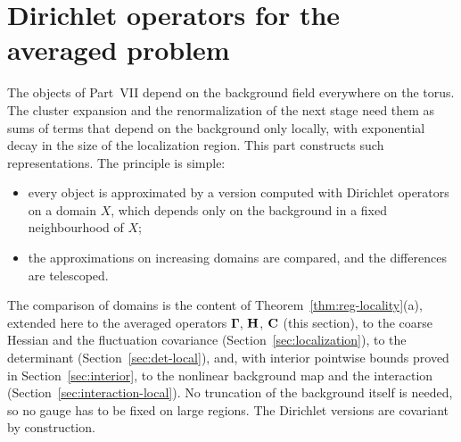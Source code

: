 \section{Dirichlet operators for the averaged problem}\label{sec:dirichlet-averaged}

The objects of Part~VII depend on the background field everywhere on the torus. The cluster expansion and the renormalization of the next stage need them as sums of terms that depend on the background only locally, with exponential decay in the size of the localization region. This part constructs such representations. The principle is simple:
\begin{itemize}
\item every object is approximated by a version computed with Dirichlet operators on a domain $X$, which depends only on the background in a fixed neighbourhood of $X$;
\item the approximations on increasing domains are compared, and the differences are telescoped.
\end{itemize}
The comparison of domains is the content of Theorem~\ref{thm:reg-locality}(a), extended here to the averaged operators $\boldsymbol\Gamma$, $\mathbf H$, $\mathbf C$ (this section), to the coarse Hessian and the fluctuation covariance (Section~\ref{sec:localization}), to the determinant (Section~\ref{sec:det-local}), and, with interior pointwise bounds proved in Section~\ref{sec:interior}, to the nonlinear background map and the interaction (Section~\ref{sec:interaction-local}). No truncation of the background itself is needed, so no gauge has to be fixed on large regions. The Dirichlet versions are covariant by construction.

